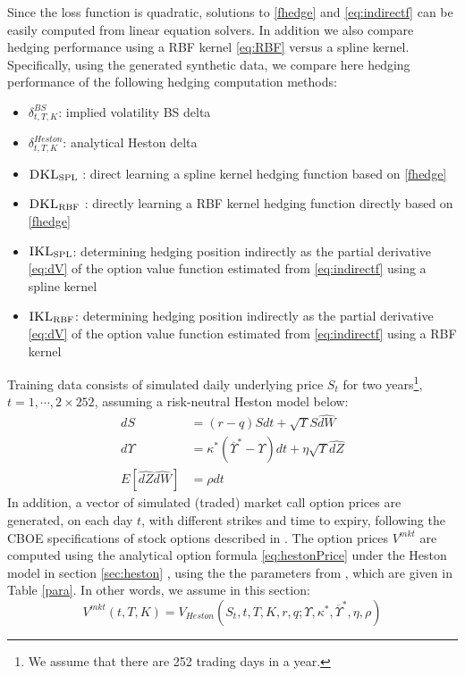 \documentclass[letterpaper,12pt,titlepage,oneside,final]{book}
\numberwithin{equation}{section}
\theoremstyle{definition}
\newcommand{\Vmkt}{V^{mkt}}
\newcommand{\DKLs}{\bf\textsc{DKL}_{\text{SPL}}}
\newcommand{\DKLg}{\bf\textsc{DKL}_{\text{RBF}}}
\newcommand{\IKLs}{\bf\textsc{IKL}_{\text{SPL}}}
\newcommand{\IKLg}{\bf\textsc{IKL}_{\text{RBF}}}
\begin{document}
Since the loss function is  quadratic, solutions to \eqref{fhedge} and \eqref{eq:indirectf}
can be easily computed from linear equation solvers.
In addition we also compare hedging performance using a RBF kernel \eqref{eq:RBF} versus a spline kernel.
Specifically, using the generated synthetic data, we compare here hedging performance  of the following hedging computation methods:
 \begin{itemize}
 \item  $\delta^{BS}_{t,T,K}$:  implied  volatility BS delta
 \item $\delta^{Heston}_{t,T,K}$:   analytical Heston delta
 \item $\DKLs$ : direct learning a spline kernel hedging  function based on \eqref{fhedge}
 \item $\DKLg$ : directly learning a RBF kernel hedging  function directly based on \eqref{fhedge}
 \item ${\IKLs}$: determining hedging position indirectly  as the partial derivative \eqref{eq:dV} of the  option value function   estimated from \eqref{eq:indirectf} using a spline kernel

\item ${\IKLg}$: determining hedging position indirectly  as the partial derivative \eqref{eq:dV} of the  option value function   estimated from \eqref{eq:indirectf} using a RBF kernel

\end{itemize}

Training data consists of simulated daily underlying price $S_t$ for two years\footnote{We assume that there are 252 trading days in a year.}, $t=1,\cdots, 2\times 252$, assuming a  risk-neutral Heston model below:
\[
	\begin{split}
	dS&=(r-q) S dt + \sqrt{\Upsilon} S \hat{dW}\\
	d\Upsilon&=\kappa^*(\overline{\Upsilon}^*-\Upsilon)dt+\eta \sqrt{\Upsilon}\hat{dZ}\\
	E[\hat{dZ}\hat{dW}]&=\rho dt
	\end{split}
\]
In addition,  a vector of simulated (traded)  market call option prices  are  generated,  on each day $t$, with different strikes and time to expiry, following  the CBOE specifications of stock options described in  \cite{hull2006options}.
 The option prices $\Vmkt$ are  computed using  the analytical option 
 formula \eqref{eq:hestonPrice} under the Heston model \citep{heston1993closed} in section \ref{sec:heston} ,
 using the the parameters  from \citep{bakshi1997empirical}, which are given in Table \ref{para}. In other words, we assume in this section:
 \[
\Vmkt(t,T,K)=V_{Heston}(S_t,t,T,K,r,q;\Upsilon,\kappa^*,\overline{\Upsilon}^*,\eta,\rho)
 \]
\end{document}
